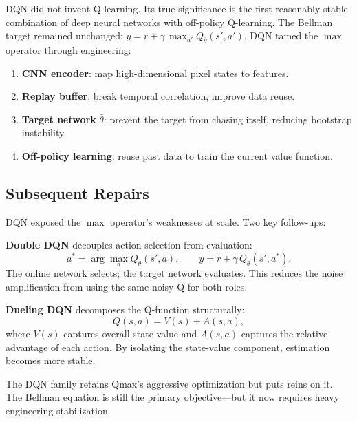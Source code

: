 DQN did not invent Q-learning.
Its true significance is the first reasonably stable combination of deep neural networks with off-policy Q-learning.
The Bellman target remained unchanged:
$y = r + \gamma\,\max_{a'} Q_{\bar\theta}(s',a')$.
DQN tamed the $\max$ operator through engineering:

\begin{enumerate}
    \item \textbf{CNN encoder}: map high-dimensional pixel states to features.
    \item \textbf{Replay buffer}: break temporal correlation, improve data reuse.
    \item \textbf{Target network} $\bar\theta$: prevent the target from chasing itself, reducing bootstrap instability.
    \item \textbf{Off-policy learning}: reuse past data to train the current value function.
\end{enumerate}

\subsection{Subsequent Repairs}

DQN exposed the $\max$ operator's weaknesses at scale.
Two key follow-ups:

\textbf{Double DQN} decouples action selection from evaluation:
\begin{equation}
a^{\ast} = \arg\max_a Q_\theta(s',a), \qquad
y = r + \gamma\, Q_{\bar\theta}(s', a^{\ast}).
\end{equation}
The online network selects; the target network evaluates.
This reduces the noise amplification from using the same noisy Q for both roles.

\textbf{Dueling DQN} decomposes the Q-function structurally:
\begin{equation}
Q(s,a) = V(s) + A(s,a),
\end{equation}
where $V(s)$ captures overall state value and $A(s,a)$ captures the relative advantage of each action.
By isolating the state-value component, estimation becomes more stable.

\begin{keyidea}
The DQN family retains Qmax's aggressive optimization but puts reins on it.
The Bellman equation is still the primary objective---but it now requires heavy engineering stabilization.
\end{keyidea}

